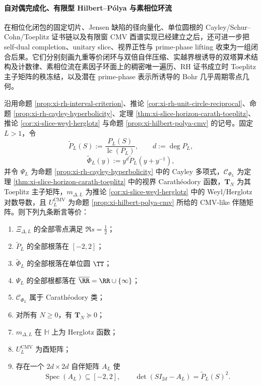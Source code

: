 \paragraph{自对偶完成化、有限型 Hilbert--P{\'o}lya 与素相位环流}
在相位化闭包的固定切片、Jensen 缺陷的径向量化、单位圆根的 Cayley/Schur--Cohn/Toeplitz 证书链以及有限窗 CMV 酉谱实现已经建立之后，还可进一步把 self-dual completion、unitary slice、视界正性与 prime-phase lifting 收束为一组闭合后果。它们分别刻画九重等价闭环与双倍自伴压缩、实越界根诱导的双塔算术结构及计数律、素相位流在素因子环面上的稠密唯一遍历、RH 证书成立时 Toeplitz 主子矩阵的秩冻结，以及潜在 prime-phase 表示所诱导的 Bohr 几乎周期零点几何。

\begin{theorem}\label{thm:xi-hilbert-polya-ninefold-equivalence-doubled-selfadjoint-compression}
沿用命题 \ref{prop:xi-rh-interval-criterion}、推论 \ref{cor:xi-rh-unit-circle-reciprocal}、命题 \ref{prop:xi-rh-cayley-hyperbolicity}、定理 \ref{thm:xi-slice-horizon-carath-toeplitz}、推论 \ref{cor:xi-slice-weyl-herglotz} 与命题 \ref{prop:xi-hilbert-polya-cmv} 的记号。固定 \(L>1\)，令
\[
\widetilde P_L(S):=\frac{P_L(S)}{\operatorname{lc}(P_L)},
\qquad
d:=\deg P_L,
\]
\[
\widetilde\Phi_L(y):=y^d\widetilde P_L(y+y^{-1}),
\]
并令 \(\Psi_L\) 为命题 \ref{prop:xi-rh-cayley-hyperbolicity} 中的 Cayley 多项式，\(\mathscr{C}_{\Phi_L}\) 为定理 \ref{thm:xi-slice-horizon-carath-toeplitz} 中的视界 Carath\'eodory 函数，\(\mathbf{T}_N\) 为其 Toeplitz 主子矩阵，\(m_{\Delta,L}\) 为推论 \ref{cor:xi-slice-weyl-herglotz} 中的 Weyl/Herglotz 对数导数，且 \(U_L^{\mathrm{CMV}}\) 为命题 \ref{prop:xi-hilbert-polya-cmv} 所给的 CMV-like 伴随矩阵。则下列九条断言等价：
\begin{enumerate}
  \item \(\Xi_{\Delta,L}\) 的全部零点满足 \(\Re s=\tfrac12\)；
  \item \(\widetilde P_L\) 的全部根落在 \([-2,2]\)；
  \item \(\widetilde\Phi_L\) 的全部根落在单位圆 \(\TT\)；
  \item \(\Psi_L\) 的全部根都落在 \(\overline{\RR}=\RR\cup\{\infty\}\)；
  \item \(\mathscr{C}_{\Phi_L}\) 属于 Carath\'eodory 类；
  \item 对所有 \(N\ge 0\)，有 \(\mathbf{T}_N\succeq 0\)；
  \item \(m_{\Delta,L}\) 在 \(\mathbb H\) 上为 Herglotz 函数；
  \item \(U_L^{\mathrm{CMV}}\) 为酉矩阵；
  \item 存在一个 \(2d\times 2d\) 自伴矩阵 \(A_L\) 使
  \[
  \operatorname{Spec}(A_L)\subseteq[-2,2],
  \qquad
  \det(SI_{2d}-A_L)=\widetilde P_L(S)^2.
  \]
\end{enumerate}
\end{theorem}

